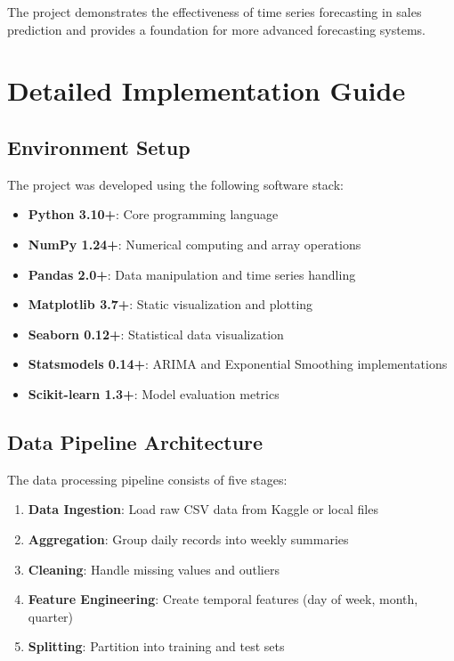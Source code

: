 \documentclass[12pt,a4paper]{report}
\begin{document}
The project demonstrates the effectiveness of time series forecasting in sales prediction and provides a foundation for more advanced forecasting systems.

\chapter{Detailed Implementation Guide}
\label{ch:implementation_guide}

\section{Environment Setup}

The project was developed using the following software stack:
\begin{itemize}
    \item \textbf{Python 3.10+}: Core programming language
    \item \textbf{NumPy 1.24+}: Numerical computing and array operations
    \item \textbf{Pandas 2.0+}: Data manipulation and time series handling
    \item \textbf{Matplotlib 3.7+}: Static visualization and plotting
    \item \textbf{Seaborn 0.12+}: Statistical data visualization
    \item \textbf{Statsmodels 0.14+}: ARIMA and Exponential Smoothing implementations
    \item \textbf{Scikit-learn 1.3+}: Model evaluation metrics
\end{itemize}

\section{Data Pipeline Architecture}

The data processing pipeline consists of five stages:
\begin{enumerate}
    \item \textbf{Data Ingestion}: Load raw CSV data from Kaggle or local files
    \item \textbf{Aggregation}: Group daily records into weekly summaries
    \item \textbf{Cleaning}: Handle missing values and outliers
    \item \textbf{Feature Engineering}: Create temporal features (day of week, month, quarter)
    \item \textbf{Splitting}: Partition into training and test sets
\end{enumerate}
\end{document}
